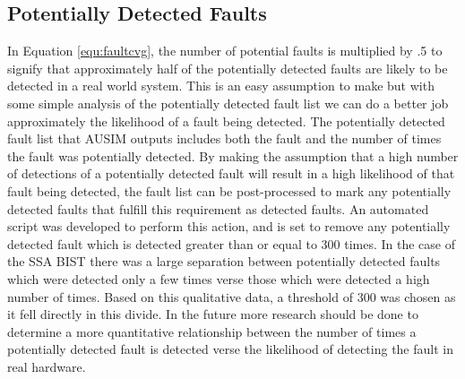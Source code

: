 \documentclass[12pt]{report}
\begin{document}
\subsection{Potentially Detected Faults}
In Equation \ref{equ:faultcvg}, the number of potential faults is multiplied by .5 to signify that approximately half of the potentially detected faults are likely to be detected in a real world system.  This is an easy assumption to make but with some simple analysis of the potentially detected fault list we can do a better job approximately the likelihood of a fault being detected.  The potentially detected fault list that AUSIM outputs includes both the fault and the number of times the fault was potentially detected.  By making the assumption that a high number of detections of a potentially detected fault will result in a high likelihood of that fault being detected, the fault list can be post-processed to mark any potentially detected faults that fulfill this requirement as detected faults.  An automated script was developed to perform this action, and is set to remove any potentially detected fault which is detected greater than or equal to 300 times.  In the case of the SSA BIST there was a large separation between potentially detected faults which were detected only a few times verse those which were detected a high number of times.  Based on this qualitative data, a threshold of 300 was chosen as it fell directly in this divide.  In the future more research should be done to determine a more quantitative relationship between the number of times a potentially detected fault is detected verse the likelihood of detecting the fault in real hardware.
\end{document}
